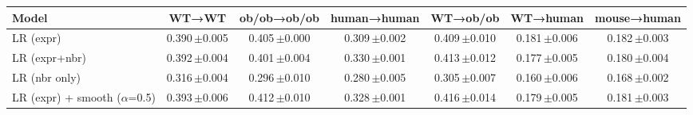 \begin{tabular}{lcccccc}
\toprule
Model & WT→WT & ob/ob→ob/ob & human→human & WT→ob/ob & WT→human & mouse→human \\
\midrule
LR (expr) & 0.390\,{\scriptsize$\pm$0.005} & 0.405\,{\scriptsize$\pm$0.000} & 0.309\,{\scriptsize$\pm$0.002} & 0.409\,{\scriptsize$\pm$0.010} & 0.181\,{\scriptsize$\pm$0.006} & 0.182\,{\scriptsize$\pm$0.003} \\
LR (expr+nbr) & 0.392\,{\scriptsize$\pm$0.004} & 0.401\,{\scriptsize$\pm$0.004} & 0.330\,{\scriptsize$\pm$0.001} & 0.413\,{\scriptsize$\pm$0.012} & 0.177\,{\scriptsize$\pm$0.005} & 0.180\,{\scriptsize$\pm$0.004} \\
LR (nbr only) & 0.316\,{\scriptsize$\pm$0.004} & 0.296\,{\scriptsize$\pm$0.010} & 0.280\,{\scriptsize$\pm$0.005} & 0.305\,{\scriptsize$\pm$0.007} & 0.160\,{\scriptsize$\pm$0.006} & 0.168\,{\scriptsize$\pm$0.002} \\
LR (expr) + smooth ($\alpha$=0.5) & 0.393\,{\scriptsize$\pm$0.006} & 0.412\,{\scriptsize$\pm$0.010} & 0.328\,{\scriptsize$\pm$0.001} & 0.416\,{\scriptsize$\pm$0.014} & 0.179\,{\scriptsize$\pm$0.005} & 0.181\,{\scriptsize$\pm$0.003} \\
\bottomrule
\end{tabular}
